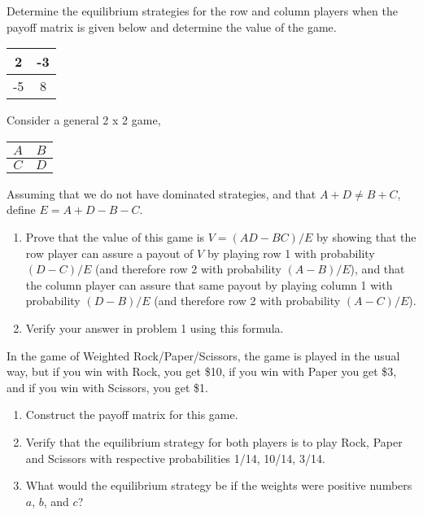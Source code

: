 \documentclass[12pt,letterpaper]{hmcpset}
\begin{document}

\begin{problem}[1]
  Determine the equilibrium strategies for the row and column players when the payoff matrix is given below and determine the value of the game.
  \begin{center}
    \begin{tabular}{|c|c|}
      \hline
      2 & -3 \\
      \hline
      -5 & 8 \\
      \hline
    \end{tabular}
  \end{center}
\end{problem}
\begin{solution}
\end{solution}
\pagebreak
\begin{problem}[2]
  Consider a general 2 x 2 game,
  \begin{center}
    \begin{tabular}{|c|c|}
      \hline
     $A$ & $B$ \\ \hline
     $C$ & $D$ \\ \hline
    \end{tabular}
  \end{center}
  Assuming that we do not have dominated strategies, and that $A + D \neq B + C$, define $E = A + D - B - C$.
  \begin{enumerate}[label=(\alph*)]
  \item Prove that the value of this game is $V = (AD - BC)/E$ by showing that the row player can assure a payout of $V$ by playing row 1 with probability $(D-C)/E$ (and therefore row 2 with probability $(A-B)/E$), and that the column player can assure that same payout by playing column 1 with probability $(D-B)/E$ (and therefore row 2 with probability $(A-C)/E$).
  \item Verify your answer in problem 1 using this formula.
  \end{enumerate}
\end{problem}
\begin{solution}

\end{solution}
\pagebreak
\begin{problem}[3]
  In the game of Weighted Rock/Paper/Scissors, the game is played in the usual way, but if you win with Rock, you get \$10, if you win with Paper you get \$3, and if you win with Scissors, you get \$1.
  \begin{enumerate}[label=(\alph*)]
  \item Construct the payoff matrix for this game.
  \item Verify that the equilibrium strategy for both players is to play Rock, Paper and Scissors with respective probabilities 1/14, 10/14, 3/14.
  \item What would the equilibrium strategy be if the weights were positive numbers $a$, $b$, and $c$?
  \end{enumerate}
\end{problem}
\begin{solution}

\end{solution}
\pagebreak
\end{document}
